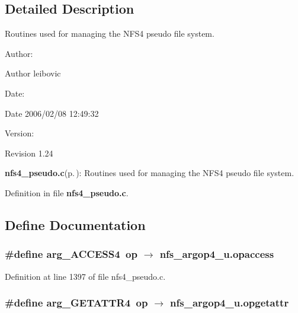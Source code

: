 \subsection{Detailed Description}
Routines used for managing the NFS4 pseudo file system. 

\begin{Desc}
\item[Author:]\begin{Desc}
\item[Author]leibovic \end{Desc}
\end{Desc}
\begin{Desc}
\item[Date:]\begin{Desc}
\item[Date]2006/02/08 12:49:32 \end{Desc}
\end{Desc}
\begin{Desc}
\item[Version:]\begin{Desc}
\item[Revision]1.24 \end{Desc}
\end{Desc}
{\bf nfs4\_\-pseudo.c}{\rm (p.\,\pageref{nfs4__pseudo_8c})}: Routines used for managing the NFS4 pseudo file system.

Definition in file {\bf nfs4\_\-pseudo.c}.

\subsection{Define Documentation}
\subsubsection{\setlength{\rightskip}{0pt plus 5cm}\#define arg\_\-ACCESS4\ op $\rightarrow$ nfs\_\-argop4\_\-u.opaccess}\label{nfs4__pseudo_8c_a6}




Definition at line 1397 of file nfs4\_\-pseudo.c.
\subsubsection{\setlength{\rightskip}{0pt plus 5cm}\#define arg\_\-GETATTR4\ op $\rightarrow$ nfs\_\-argop4\_\-u.opgetattr}\label{nfs4__pseudo_8c_a3}


